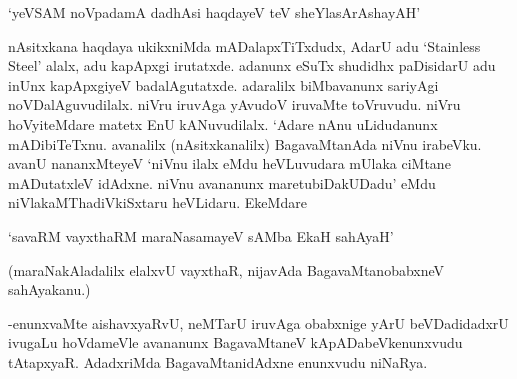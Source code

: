 \begin{shloka}
`yeVSAM noVpadamA dadhAsi haqdayeV teV sheYlasArAshayAH'
\end{shloka}

nAsitxkana haqdaya ukikxniMda mADalapxTiTxdudx, AdarU adu `{\eng Stainless Steel}' alalx, adu kapApxgi irutatxde. adanunx eSuTx shudidhx paDisidarU adu inUnx kapApxgiyeV badalAgutatxde. adaralilx biMbavanunx sariyAgi noVDalAguvudilalx. niVru iruvAga yAvudoV iruvaMte toVruvudu. niVru hoVyiteMdare matetx EnU kANuvudilalx. `Adare nAnu uLidudanunx mADibiTeTxnu. avanalilx (nAsitxkanalilx) BagavaMtanAda niVnu irabeVku. avanU nananxMteyeV `niVnu ilalx eMdu heVLuvudara mUlaka ciMtane mADutatxleV idAdxne. niVnu avananunx maretubiDakUDadu' eMdu niVlakaMThadiVkiSxtaru heVLidaru. EkeMdare

\begin{shloka}
`savaRM vayxthaRM maraNasamayeV sAMba EkaH sahAyaH'
\end{shloka}

(maraNakAladalilx elalxvU vayxthaR, nijavAda BagavaMtanobabxneV sahAyakanu.)

-enunxvaMte aishavxyaRvU, neMTarU iruvAga obabxnige yArU beVDadidadxrU ivugaLu hoVdameVle avananunx BagavaMtaneV kApADabeVkenunxvudu tAtapxyaR. AdadxriMda BagavaMtanidAdxne enunxvudu niNaRya.



\endchapter
